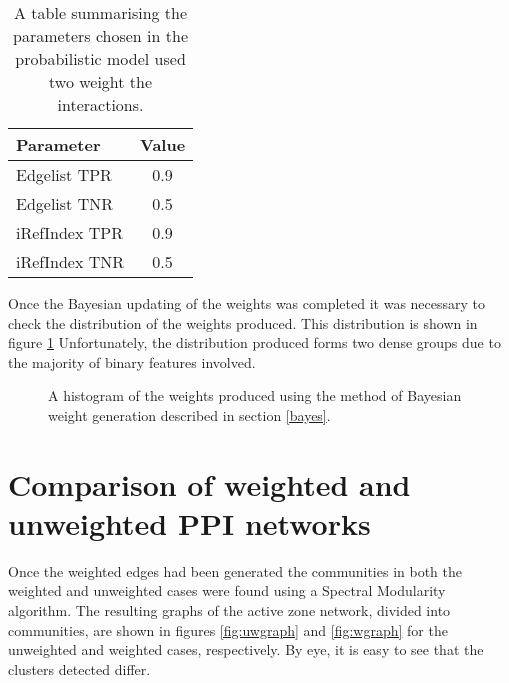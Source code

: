\begin{table}
    \centering
    \begin{tabular}{l c }
        Parameter       & Value \\
        \hline
        Edgelist \ac{TPR}    & 0.9 \\
        Edgelist TNR    & 0.5 \\
        iRefIndex \ac{TPR}   & 0.9 \\
        iRefIndex TNR   & 0.5 \\
    \end{tabular}
    \caption{A table summarising the parameters chosen in the probabilistic model used two weight the interactions.}
    \label{tab:estimates}
\end{table}

Once the Bayesian updating of the weights was completed it was necessary to check the distribution of the weights produced.
This distribution is shown in figure \ref{fig:weightdist}
Unfortunately, the distribution produced forms two dense groups due to the majority of binary features involved.

\begin{figure}
    \centering
    \setlength\figureheight{3in}
    \setlength\figurewidth{4in}
    \caption{A histogram of the weights produced using the method of Bayesian weight generation described in section \ref{bayes}.}
    \label{fig:weightdist}
\end{figure}


\section{Comparison of weighted and unweighted \ac{PPI} networks}

Once the weighted edges had been generated the communities in both the weighted and unweighted cases were found using a Spectral Modularity algorithm.
The resulting graphs of the active zone network, divided into communities, are shown in figures \ref{fig:uwgraph} and \ref{fig:wgraph} for the unweighted and weighted cases, respectively.
By eye, it is easy to see that the clusters detected differ.


